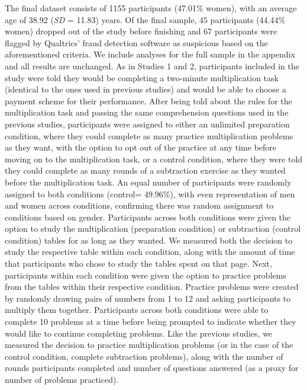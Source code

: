 \documentclass[a4paper, nobind]{templates/ociamthesis}
\begin{document}
The final dataset consists of 1155 participants (47.01\% women), with an average age of 38.92 (\emph{SD} = 11.83) years. Of the final sample, 45 participants (44.44\% women) dropped out of the study before finishing and 67 participants were flagged by Qualtrics' fraud detection software as suspicious based on the aforementioned criteria. We include analyses for the full sample in the appendix and all results are unchanged. As in Studies 1 and 2, participants included in the study were told they would be completing a two-minute multiplication task (identical to the ones used in previous studies) and would be able to choose a payment scheme for their performance. After being told about the rules for the multiplication task and passing the same comprehension questions used in the previous studies, participants were assigned to either an unlimited preparation condition, where they could complete as many practice multiplication problems as they want, with the option to opt out of the practice at any time before moving on to the multiplication task, or a control condition, where they were told they could complete as many rounds of a subtraction exercise as they wanted before the multiplication task. An equal number of participants were randomly assigned to both conditions (control= 49.96\%), with even representation of men and women across conditions, confirming there was random assignment to conditions based on gender. Participants across both conditions were given the option to study the multiplication (preparation condition) or subtraction (control condition) tables for as long as they wanted. We measured both the decision to study the respective table within each condition, along with the amount of time that participants who chose to study the tables spent on that page. Next, participants within each condition were given the option to practice problems from the tables within their respective condition. Practice problems were created by randomly drawing pairs of numbers from 1 to 12 and asking participants to multiply them together. Participants across both conditions were able to complete 10 problems at a time before being prompted to indicate whether they would like to continue completing problems. Like the previous studies, we measured the decision to practice multiplication problems (or in the case of the control condition, complete subtraction problems), along with the number of rounds participants completed and number of questions answered (as a proxy for number of problems practiced).
\end{document}
